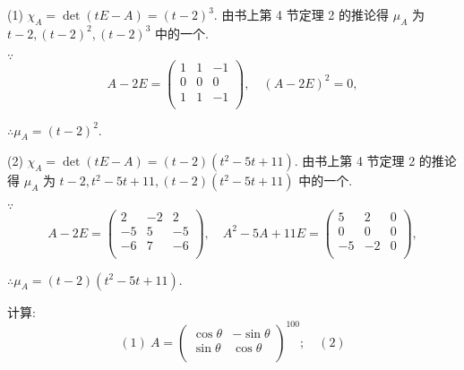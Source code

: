\documentclass[color=black,device=normal,lang=cn,mode=geye]{elegantnote}
\begin{document}
\begin{solution}
    (1) $\chi_A=\det(tE-A)=(t-2)^3$. 由书上第 4 节定理 2 的推论得 $\mu_A$ 为 $t-2,(t-2)^2,(t-2)^3$ 中的一个.

    $\because$
    \[A-2E=\begin{pmatrix}
        1 & 1 & -1 \\
        0 & 0 & 0 \\
        1 & 1 & -1 \\
    \end{pmatrix},\quad(A-2E)^2=0,\]

    $\therefore\mu_A=(t-2)^2$.

    (2) $\chi_A=\det(tE-A)=(t-2)(t^2-5t+11)$. 由书上第 4 节定理 2 的推论得 $\mu_A$ 为 $t-2,t^2-5t+11,(t-2)(t^2-5t+11)$ 中的一个.

    $\because$
    \[A-2E=\begin{pmatrix}
        2 & -2 & 2 \\
        -5 & 5 & -5 \\
        -6 & 7 & -6 \\
    \end{pmatrix},\quad A^2-5A+11E=\begin{pmatrix}
        5 & 2 & 0 \\
        0 & 0 & 0 \\
        -5 & -2 & 0 \\
    \end{pmatrix},\]

    $\therefore\mu_A=(t-2)(t^2-5t+11)$.
\end{solution}
\begin{exercisec}[2.4.2]
    计算:
    \[(1)\ A=\begin{pmatrix}
        \cos\theta & -\sin\theta \\
        \sin\theta & \cos\theta \\
    \end{pmatrix}^{100};\quad(2)\]
\end{exercisec}
\begin{solution}
\end{solution}
\end{document}
